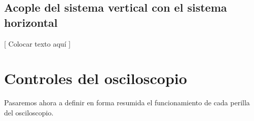 \documentclass{article}
\begin{document}
\subsection{Acople del sistema vertical con el sistema horizontal}

	[ Colocar texto aquí ]
	\bigskip\bigskip




\section{Controles del osciloscopio}

	Pasaremos ahora a definir en forma resumida el funcionamiento de cada perilla del osciloscopio. 
\bigskip
\end{document}
